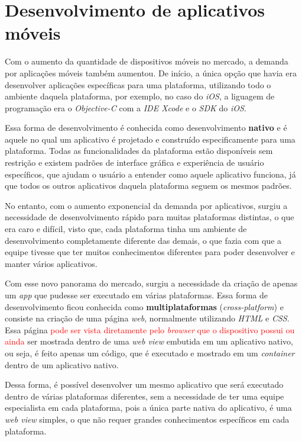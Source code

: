 \chapter{Desenvolvimento de aplicativos móveis} \label{referencialteorico}

Com o aumento da quantidade de dispositivos móveis no mercado, a demanda por aplicações móveis também aumentou.
De início, a única opção que havia era desenvolver aplicações específicas para uma plataforma, utilizando todo o ambiente daquela plataforma, por exemplo,
no caso do \textit{iOS}, a liguagem de programação era o \textit{Objective-C} com a \textit{IDE Xcode} e o \textit{SDK} do \textit{iOS}.


Essa forma de desenvolvimento é conhecida como desenvolvimento \textbf{nativo} e é aquele no qual um aplicativo é projetado e construído especificamente para uma plataforma. 
Todas as funcionalidades da plataforma estão disponíveis sem restrição e existem padrões de interface gráfica e experiência de usuário específicos, que ajudam o usuário a 
entender como aquele aplicativo funciona, já que todos os outros aplicativos daquela plataforma seguem os mesmos padrões. 


No entanto, com o aumento exponencial da demanda por aplicativos, surgiu a necessidade de desenvolvimento rápido para muitas plataformas distintas, o que era caro e difícil,
visto que, cada plataforma tinha um ambiente de desenvolvimento completamente diferente das demais, o que fazia com que a equipe tivesse que ter muitos conhecimentos diferentes
para poder desenvolver e manter vários aplicativos.  


Com esse novo panorama do mercado, surgiu a necessidade da criação de apenas um \textit{app} que pudesse ser executado em várias plataformas. Essa forma de desenvolvimento ficou conhecida como 
\textbf{multiplataformas} (\textit{cross-platform}) e consiste na criação de uma página \textit{web}, 
normalmente utilizando \textit{HTML} e \textit{CSS}. Essa página \textcolor{red}{pode ser vista diretamente pelo \textit{browser} que o dispositivo possui ou ainda} ser mostrada dentro de uma \textit{web view} 
embutida em um aplicativo nativo, ou seja, é feito apenas um código, que é executado e mostrado em um \textit{container} dentro de um aplicativo nativo. 


Dessa forma, é possível desenvolver um mesmo aplicativo que será executado dentro de várias plataformas diferentes, sem a necessidade de ter uma equipe especialista em cada plataforma, pois a única 
parte nativa do aplicativo, é uma \textit{web view} simples, o que não requer grandes conhecimentos específicos em cada plataforma.


